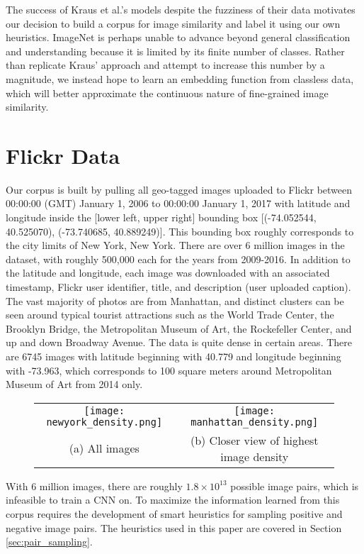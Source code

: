 
The success of Kraus et al.'s models despite the fuzziness of their data motivates our decision to build a corpus for image similarity and label it using our own heuristics. ImageNet is perhaps unable to advance beyond general classification and understanding because it is limited by its finite number of classes. Rather than replicate Kraus' approach and attempt to increase this number by a magnitude, we instead hope to learn an embedding function from classless data, which will better approximate the continuous nature of fine-grained image similarity.

\section{Flickr Data}\label{sec:flickr_data}
Our corpus is built by pulling all geo-tagged images uploaded to Flickr between 00:00:00 (GMT) January 1, 2006 to 00:00:00 January 1, 2017 with latitude and longitude inside the [lower left, upper right] bounding box [(-74.052544, 40.525070), (-73.740685, 40.889249)]. This bounding box roughly corresponds to the city limits of New York, New York. There are over 6 million images in the dataset, with roughly 500,000 each for the years from 2009-2016. In addition to the latitude and longitude, each image was downloaded with an associated timestamp, Flickr user identifier, title, and description (user uploaded caption). The vast majority of photos are from Manhattan, and distinct clusters can be seen around typical tourist attractions such as the World Trade Center, the Brooklyn Bridge, the Metropolitan Museum of Art, the Rockefeller Center, and up and down Broadway Avenue. The data is quite dense in certain areas. There are 6745 images with latitude beginning with 40.779 and longitude beginning with -73.963, which corresponds to 100 square meters around Metropolitan Museum of Art from 2014 only.



\begin{figure}[!htbp]
	\centering
	\begin{tabular}{cc}
		  \texttt{[image: newyork\_density.png]} &   \texttt{[image: manhattan\_density.png]} \\
		(a) All images & (b) Closer view of highest image density \\[6pt]
	\end{tabular}
\label{fig:densities}
\end{figure}

With 6 million images, there are roughly $1.8\times 10^{13}$ possible image pairs, which is infeasible to train a CNN on. To maximize the information learned from this corpus requires the development of smart heuristics for sampling positive and negative image pairs. The heuristics used in this paper are covered in Section \ref{sec:pair_sampling}.

